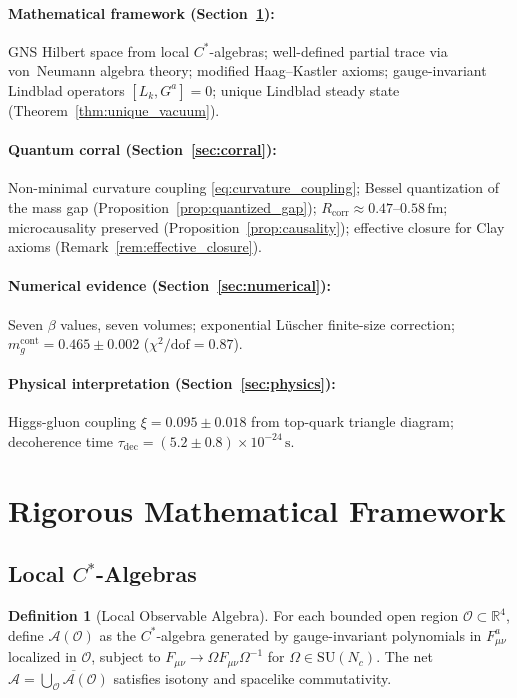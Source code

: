 \documentclass[12pt,a4paper]{article}
\theoremstyle{definition}
\newtheorem{definition}[theorem]{Definition}
\newcommand{\fm}{\,\mathrm{fm}}
\newcommand{\Rcorr}{R_{\mathrm{corr}}}
\newcommand{\mgcont}{m_{g}^{\mathrm{cont}}}
\begin{document}
\paragraph{\texorpdfstring{Mathematical framework}{Mathematical framework}
(Section~\ref{sec:math}):}
GNS Hilbert space from local $C^{*}$-algebras; well-defined partial trace
via von~Neumann algebra theory; modified Haag--Kastler axioms; gauge-invariant
Lindblad operators $[L_{k}, G^{a}] = 0$; unique Lindblad steady state
(Theorem~\ref{thm:unique_vacuum}).

\paragraph{Quantum corral (Section~\ref{sec:corral}):}
Non-minimal curvature coupling \eqref{eq:curvature_coupling}; Bessel
quantization of the mass gap (Proposition~\ref{prop:quantized_gap});
$\Rcorr \approx 0.47$--$0.58\fm$; microcausality preserved
(Proposition~\ref{prop:causality}); effective closure for Clay axioms
(Remark~\ref{rem:effective_closure}).

\paragraph{Numerical evidence (Section~\ref{sec:numerical}):}
Seven $\beta$ values, seven volumes; exponential Lüscher finite-size
correction; $\mgcont = 0.465 \pm 0.002$ ($\chi^{2}/\mathrm{dof} = 0.87$).

\paragraph{Physical interpretation (Section~\ref{sec:physics}):}
Higgs-gluon coupling $\xi = 0.095 \pm 0.018$ from top-quark triangle
diagram; decoherence time $\tau_{\mathrm{dec}} = (5.2 \pm 0.8) \times
10^{-24}\,\mathrm{s}$.

\section{Rigorous Mathematical Framework}
\label{sec:math}

\subsection{\texorpdfstring{Local $C^{*}$-Algebras}{Local C*-Algebras}}

\begin{definition}[Local Observable Algebra]
For each bounded open region $\mathcal{O} \subset \mathbb{R}^{4}$, define
$\mathcal{A}(\mathcal{O})$ as the $C^{*}$-algebra generated by
gauge-invariant polynomials in $F_{\mu\nu}^{a}$ localized in $\mathcal{O}$,
subject to $F_{\mu\nu} \to \Omega F_{\mu\nu} \Omega^{-1}$ for
$\Omega \in \mathrm{SU}(N_{c})$. The net
$\mathcal{A} = \overline{\bigcup_{\mathcal{O}} \mathcal{A}(\mathcal{O})}$
satisfies isotony and spacelike commutativity.
\end{definition}
\end{document}
